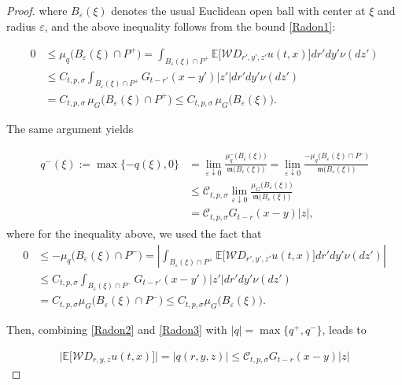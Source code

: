 \documentclass[letterpaper, 11pt,  reqno]{amsart}
\newcommand{\noi}{\noindent}
\newcommand{\W}{\mathcal{W}}
\newcommand{\E}{\mathbb{E}}
\newcommand{\eps}{\varepsilon}
\newcommand{\s}{\sigma}
\newcommand{\fm}{\mathfrak{m}}
\numberwithin{equation}{section}
\numberwithin{theorem}{section}
\begin{document}
\begin{proof}
\noi
where    $B_\eps(\xi)$ denotes the usual Euclidean open ball with center at $\xi$ and radius $\eps$,
and
the above inequality follows from the bound \eqref{Radon1}:

\noi
\begin{align*}
0 & \leq \mu_q \big(B_{\varepsilon}(\xi)\cap P^{+}\big)
=\int_{B_{\varepsilon}(\xi)\cap P^{+}}
\E\big[ \W D_{r', y', z'} u(t,x) \big]  dr'dy' \nu(dz')\\
&\leq C_{t,p,\s } \int_{B_{\varepsilon}(\xi)\cap P^{+}}  G_{t-r'}(x-y') |z'|dr'dy' \nu(dz')\\
&= C_{t,p,\s} \, \mu_G \big( B_\eps(\xi)\cap P^{+}\big) \leq
C_{t,p,\s} \, \mu_G \big( B_\eps(\xi)\big).
\end{align*}


The same argument yields

\noi
\begin{align}
\begin{aligned}
q^-(\xi) :=  \max\{ - q(\xi), 0 \} 
& =  \lim_{\eps\downarrow  0}
  \frac{ \mu_q^- \big(  B_\eps(\xi)    \big)    }{ \fm  \big(B_\eps(\xi)    \big) }
  =  \lim_{\eps\downarrow  0}   \frac{ -\mu_q \big( B_\eps(\xi) \cap P^{-}  \big)    }{ \fm  \big( B_\eps(\xi)    \big) }
   \\
  &\leq   \mathcal{C}_{t,p,\s} 
    \lim_{\eps\downarrow  0}
  \frac{ \mu_G \big( B_\eps (\xi)    \big)     }{ \fm  \big( B_\eps(\xi)    \big) } \\
  &= \mathcal{C}_{t,p,\s} 
    G_{t-r}(x-y) |z|,
\end{aligned}
\label{Radon3}
\end{align}
where for the inequality above, we used the fact that
\begin{align*}
0 & \leq -\mu_q \big(B_{\eps}(\xi)\cap P^{-}\big)
=\left|\int_{B_{\eps}(\xi)\cap P^{+}}\E\big[ \W D_{r', y', z'} u(t,x) \big]  dr'dy' \nu(dz')\right|\\
&\leq C_{t,p,\s } \int_{B_{\eps}(\xi)\cap P^{-}}  G_{t-r'}(x-y') |z'|dr'dy' \nu(dz')\\
&= C_{t,p,\s }  \mu_G \big(B_\eps(\xi)\cap P^{-}\big) 
\leq  C_{t,p,\s}  \mu_G \big(B_\eps(\xi)\big).
\end{align*}



Then, combining \eqref{Radon2} and \eqref{Radon3}
with $|q| = \max\{ q^+, q^-\}$,
 leads to 

\noi
\begin{align}\label{Radon4}
\Big| \E\big[ \W D_{r, y, z} u(t,x) \big]  \Big| =|q(r,y,z)| \leq   \mathcal{C}_{t,p,\s}   G_{t-r}(x-y) |z|
\end{align}


\end{proof}
\end{document}
